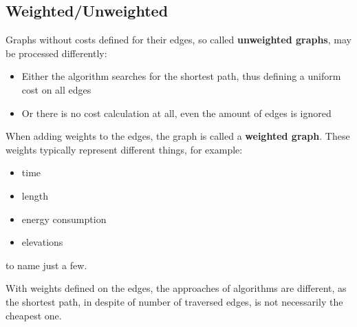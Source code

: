 \subsection{Weighted/Unweighted}

Graphs without costs defined for their edges, so called \textbf{unweighted graphs}, may be processed differently: 
\begin{itemize}
\item Either the algorithm searches for the shortest path, thus defining a uniform cost on all edges
\item Or there is no cost calculation at all, even the amount of edges is ignored
\end{itemize}

When adding weights to the edges, the graph is called a \textbf{weighted graph}. These weights typically represent different things, for example:
\begin{itemize}
\item time
\item length
\item energy consumption
\item elevations
\end{itemize}
to name just a few.

With weights defined on the edges, the approaches of algorithms are different, as the shortest path, in despite of number of traversed edges, is not necessarily the cheapest one. 



